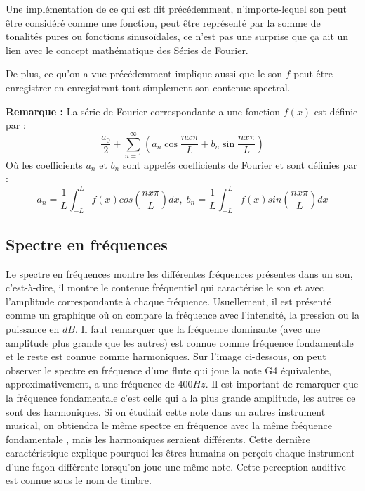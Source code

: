 \documentclass[conference,onecolumn]{IEEEtran}
\begin{document}
Une implémentation de ce qui est dit précédemment, n’importe-lequel son peut être considéré comme une fonction, peut être représenté par la somme de tonalités pures ou fonctions sinusoïdales, ce n’est pas une surprise que ça ait un lien avec le concept mathématique des Séries de Fourier. 

De plus, ce qu’on a vue précédemment implique aussi que le son $f$ peut être enregistrer en enregistrant tout simplement son contenue spectral.

\textbf{Remarque :} La série de Fourier  correspondante a une fonction $f(x)$ est définie par :
\begin{equation}
\frac{a_0}{2} + \sum_{n=1}^{\infty}(a_n\cos{\frac{nx\pi}{L}} + b_n\sin{\frac{nx\pi}{L}})
\end{equation}
Où les coefficients $a_n$ et $b_n$ sont appelés coefficients de Fourier et sont définies par :
\begin{equation}
    a_n = \frac{1}{L} \int_{-L}^{L}f(x)cos(\frac{nx\pi}{L})dx,\;
    b_n = \frac{1}{L} \int_{-L}^{L}f(x)sin(\frac{nx\pi}{L})dx
\end{equation}


\subsection{Spectre en fréquences}
Le spectre en fréquences montre les différentes fréquences présentes dans un son, c’est-à-dire, il montre le contenue fréquentiel qui caractérise le son et avec l’amplitude correspondante à chaque fréquence. Usuellement, il est présenté comme un graphique où on compare la fréquence avec l’intensité, la pression ou la puissance en $dB$. Il faut remarquer que la fréquence dominante (avec une amplitude plus grande que les autres) est connue comme fréquence fondamentale et le reste est connue comme harmoniques. Sur l’image ci-dessous, on peut observer le spectre en fréquence d’une flute qui joue la note G4 équivalente, approximativement, a une fréquence de $400 Hz$. Il est important de remarquer que la fréquence fondamentale c’est celle qui a la plus grande amplitude, les autres ce sont des harmoniques. Si on étudiait cette note dans un autres instrument musical, on obtiendra le même spectre en fréquence avec la même fréquence fondamentale , mais les harmoniques seraient différents. Cette dernière caractéristique explique pourquoi les êtres humains on perçoit chaque instrument d’une façon différente lorsqu’on joue une même note. Cette perception auditive est connue sous le nom de \underline{timbre}.
\end{document}
